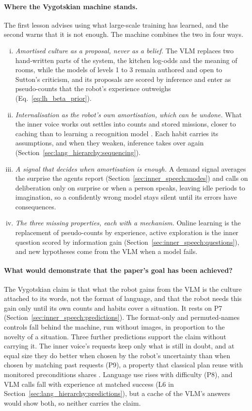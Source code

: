 \paragraph{Where the Vygotskian machine stands.}
The first lesson advises using what large-scale training has learned, and the second warns that it is not enough.
The machine combines the two in four ways.
\begin{enumerate}[(i)]
    \item \emph{Amortised culture as a proposal, never as a belief.} The VLM replaces two hand-written parts of the
    system, the kitchen log-odds and the meaning of rooms, while the models of levels 1 to 3 remain authored and open
    to Sutton's criticism, and its proposals are scored by inference and
    enter as pseudo-counts that the robot's experience outweighs (Eq.~\eqref{eq:lh_beta_prior}).
    \item \emph{Internalisation as the robot's own amortisation, which can be undone.} What the inner voice works out
    settles into counts and stored missions, closer to caching than to learning a recognition model
    \cite{gershman2014amortized}. Each habit carries its assumptions, and when they weaken, inference takes over
    again (Section~\ref{sec:lang_hierarchy:sequencing}).
    \item \emph{A signal that decides when amortisation is enough.} A demand signal averages the surprise the agents
    report (Section~\ref{sec:inner_speech:modes}) and calls on deliberation only on surprise or when a person speaks, leaving idle periods to
    imagination, so a confidently wrong
    model stays silent until its errors have consequences.
    \item \emph{The three missing properties, each with a mechanism.} Online learning is the replacement of
    pseudo-counts by experience, active exploration is the inner question scored by information gain
    (Section~\ref{sec:inner_speech:questions}), and new hypotheses come from the VLM when a model fails.
\end{enumerate}

\paragraph{What would demonstrate that the paper's goal has been achieved?}
The Vygotskian claim is that what the robot gains from the VLM is the culture attached to its words, not the format
of language, and that the robot needs this gain only until its own counts and habits cover a situation. It rests on
P7 (Section~\ref{sec:inner_speech:predictions}). The format-only and permuted-names
controls fall behind the machine, run without images, in proportion to the novelty of a situation. Three further predictions support the claim without carrying it. The inner
voice's requests keep only what is still in doubt, and at equal size they do better when chosen by the robot's
uncertainty than when chosen by matching past requests (P9), a property that classical plan reuse with monitored
preconditions shares \cite{fikes1972learning}. Language use rises with difficulty (P8), and VLM calls fall with
experience at matched success (L6 in Section~\ref{sec:lang_hierarchy:predictions}), but a cache of the VLM's answers
would show both, so neither carries the claim.
